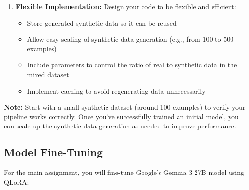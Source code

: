 \documentclass[11pt]{article}
\begin{document}
\begin{enumerate}
    \item \textbf{Flexible Implementation:} Design your code to be flexible and efficient:
    \begin{itemize}
        \item Store generated synthetic data so it can be reused
        \item Allow easy scaling of synthetic data generation (e.g., from 100 to 500 examples)
        \item Include parameters to control the ratio of real to synthetic data in the mixed dataset
        \item Implement caching to avoid regenerating data unnecessarily
    \end{itemize}
\end{enumerate}

\textbf{Note:} Start with a small synthetic dataset (around 100 examples) to verify your pipeline works correctly. Once you've successfully trained an initial model, you can scale up the synthetic data generation as needed to improve performance.

\subsection{Model Fine-Tuning}

For the main assignment, you will fine-tune Google's Gemma 3 27B model using QLoRA:
\end{document}
